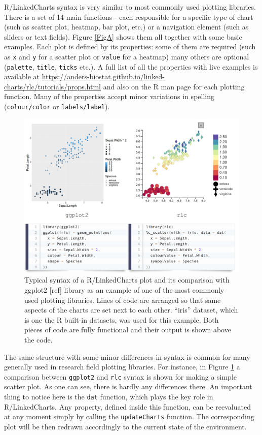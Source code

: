 \documentclass[twocolumn,10pt]{article}
\begin{document}
R/LinkedCharts syntax is very similar to most commonly used plotting libraries. There is a set of 14 main functions - each responsible for a specific type of chart (such as scatter plot, heatmap, bar plot, etc.) or a navigation element (such as sliders or text fields). Figure \ref{FigA} shows them all together with some basic examples. Each plot is defined by its properties: some of them are required (such as \texttt{x} and \texttt{y} for a scatter plot or \texttt{value} for a heatmap) many others are optional (\texttt{palette}, \texttt{title}, \texttt{ticks} etc.). A full list of all the properties with live examples is available at \url{https://anders-biostat.github.io/linked-charts/rlc/tutorials/props.html} and also on the R man page for each plotting function. Many of the properties accept minor variations in spelling (\texttt{colour/color} or \texttt{labels/label}).

\begin{figure}
	\includegraphics[width=\textwidth]{FigB/figB.png}
	\caption{Typical syntax of a R/LinkedCharts plot and its comparison with ggplot2 [ref] library as an example of one of the most commonly used plotting libraries. Lines of code are arranged so that same aspects of the charts are set next to each other. ``iris'' dataset, which is one the R built-in datasets, was used for this example. Both pieces of code are fully functional and their output is shown above the code.}
	\label{FigB}
\end{figure}

The same structure with some minor differences in syntax is common for many generally used in research field plotting libraries. For instance, in Figure \ref{FigB} a comparison between \texttt{ggplot2} and \texttt{rlc} syntax is shown for making a simple scatter plot. As one can see, there is hardly any differences there. An important thing to notice here is the \texttt{dat} function, which plays the key role in R/LinkedCharts. Any property, defined inside this function, can be reevaluated at any moment simply by calling the \texttt{updateCharts} function. The corresponding plot will be then redrawn accordingly to the current state of the environment.
\end{document}
